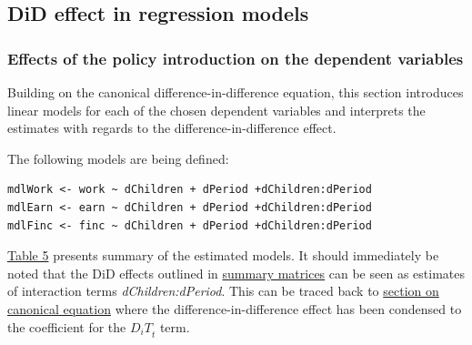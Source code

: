 \documentclass{article}
\begin{document}
\subsection{DiD effect in regression models}
\label{basicDiD}

\subsubsection{Effects of the policy introduction on the dependent variables}

Building on the canonical difference-in-difference equation, this section introduces linear models for each of the chosen dependent variables and interprets the estimates with regards to the difference-in-difference effect.

The following models are being defined:
\begin{verbatim}
mdlWork <- work ~ dChildren + dPeriod +dChildren:dPeriod
mdlEarn <- earn ~ dChildren + dPeriod +dChildren:dPeriod
mdlFinc <- finc ~ dChildren + dPeriod +dChildren:dPeriod
\end{verbatim}

\hyperref[tab:summaryEITC]{Table 5} presents summary of the estimated models. It should immediately be noted that the DiD effects outlined in \hyperref[matrices]{summary matrices} can be seen as estimates of interaction terms \emph{dChildren:dPeriod}. This can be traced back to \hyperref[canonical]{section on canonical equation} where the difference-in-difference effect has been condensed to the coefficient for the ${D_iT}_t$ term. 
\end{document}
